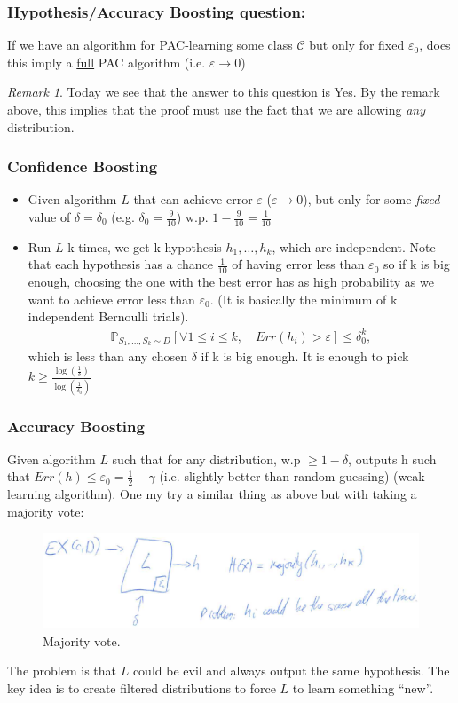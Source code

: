 \documentclass[12pt, letterpaper]{article}
\numberwithin{equation}{section} %
\newcommand{\ul}{\underline}
\newcommand{\mb}{\mathbb}
\newcommand{\mc}{\mathcal}
\newcommand{\ve}{\varepsilon}
\theoremstyle{definition}
\theoremstyle{remark}
\newtheorem{remark}[theorem]{Remark}
\begin{document}
\subsubsection*{Hypothesis/Accuracy Boosting question:}
If we have an algorithm for PAC-learning some class $\mc C$ but only for \ul{fixed} $\ve_0$, does this imply a \ul{full} PAC algorithm (i.e. $\ve\to 0$)
\begin{remark}
Today we see that the answer to this question is Yes. By the remark above, this implies that the proof must use the fact that we are allowing \emph{any} distribution.
\end{remark}

\subsubsection{Confidence Boosting}
\begin{itemize}
\item Given algorithm $L$ that can achieve error $\ve$ ($\ve\to0$), but only for some \emph{fixed} value of $\delta=\delta_0$ (e.g. $\delta_0=\frac9{10}$) w.p. $1 - \frac9{10} = \frac1{10}$
\item Run $L$ k times, we get k hypothesis $h_1,\ldots,h_k$, which are independent. Note that each hypothesis has a chance $\frac1{10}$ of having error less than $\ve_0$ so if k is big enough, choosing the one with the best error has as high probability as we want to achieve error less than $\ve_0$. (It is basically the minimum of k independent Bernoulli trials).
\begin{align}
\mb P_{S_1,\ldots, S_k\sim D}\left[\forall 1\leq i \leq k, \quad Err(h_i)>\ve\right]\leq \delta_0^k,
\end{align}
which is less than any chosen $\delta$ if k is big enough. It is enough to pick $k\geq \frac{\log\left(\frac1\delta\right)}{\log\left(\frac1{\delta_0}\right)}$
\end{itemize}

\subsubsection{Accuracy Boosting}
Given algorithm $L$ such that for any distribution, w.p $\geq 1-\delta$, outputs h such that $Err(h) \leq \ve_0 = \frac12 - \gamma$ (i.e. slightly better than random guessing) (weak learning algorithm). One my try a similar thing as above but with taking a majority vote:
\begin{figure}[H]
\centering
\includegraphics[width=0.6\linewidth]{img/majority.png}
\caption{Majority vote.}
\end{figure}
The problem is that $L$ could be evil and always output the same hypothesis. The key idea is to create filtered distributions to force $L$ to learn something ``new''.
\end{document}

